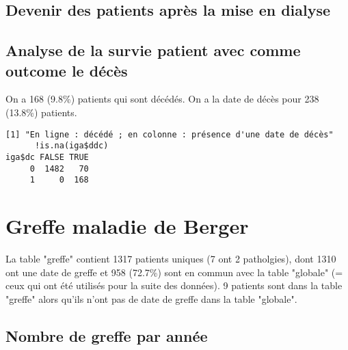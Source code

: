 \documentclass[11pt,a4paper]{article}\usepackage[]{graphicx}\usepackage[]{color}
\makeatletter
\newenvironment{kframe}{%
 \def\at@end@of@kframe{}%
 \ifinner\ifhmode%
  \def\at@end@of@kframe{\end{minipage}}%
  \begin{minipage}{\columnwidth}%
 \fi\fi%
 \def\FrameCommand##1{\hskip\@totalleftmargin \hskip-\fboxsep
 \colorbox{shadecolor}{##1}\hskip-\fboxsep
     \hskip-\linewidth \hskip-\@totalleftmargin \hskip\columnwidth}%
 \MakeFramed {\advance\hsize-\width
   \@totalleftmargin\z@ \linewidth\hsize
   \@setminipage}}%
 {\par\unskip\endMakeFramed%
 \at@end@of@kframe}
\newenvironment{knitrout}{}{} %
\makeatother
\begin{document}
  \subsection{Devenir des patients après la mise en dialyse}
  
  \subsection{Analyse de la survie patient avec comme outcome le décès}
  
  On a 168 (9.8\%) patients qui sont décédés. On a la date de décès pour 238 (13.8\%) patients.

\begin{knitrout}
\color{fgcolor}\begin{kframe}
\begin{verbatim}
[1] "En ligne : décédé ; en colonne : présence d'une date de décès"
      !is.na(iga$ddc)
iga$dc FALSE TRUE
     0  1482   70
     1     0  168
\end{verbatim}
\end{kframe}
\end{knitrout}

  
\section{Greffe maladie de Berger}

La table "greffe" contient 1317 patients uniques (7 ont 2 patholgies), dont 1310 ont une date de greffe et 958 (72.7\%) sont en commun avec la table "globale" (= ceux qui ont été utilisés pour la suite des données). 9 patients sont dans la table "greffe" alors qu'ils n'ont pas de date de greffe dans la table "globale".

  \subsection{Nombre de greffe par année}
\end{document}
